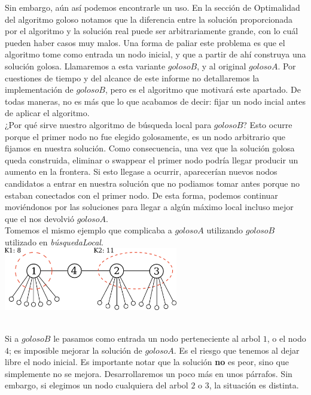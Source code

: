 Sin embargo, aún así podemos encontrarle un uso. En la sección de Optimalidad del algoritmo goloso notamos que la diferencia entre la solución proporcionada por el algoritmo y la solución real puede ser arbitrariamente grande, con lo cuál pueden haber casos muy malos. Una forma de paliar este problema es que el algoritmo tome como entrada un nodo inicial, y que a partir de ahí construya una solución golosa. Llamaremos a esta variante $golosoB$, y al original $golosoA$. Por cuestiones de tiempo y del alcance de este informe no detallaremos la implementación de $golosoB$, pero es el algoritmo que motivará este apartado. De todas maneras, no es más que lo que acabamos de decir: fijar un nodo incial antes de aplicar el algoritmo. \\

¿Por qué sirve nuestro algoritmo de búsqueda local para $golosoB$? Esto ocurre porque el primer nodo no fue elegido golosamente, es un nodo arbitrario que fijamos en nuestra solución. Como consecuencia, una vez que la solución golosa queda construida, eliminar o swappear el primer nodo podría llegar producir un aumento en la frontera. Si esto llegase a ocurrir, aparecerían nuevos nodos candidatos a entrar en nuestra solución que no podiamos tomar antes porque no estaban conectados con el primer nodo. De esta forma, podemos continuar moviéndonos por las soluciones para llegar a algún máximo local incluso mejor que el nos devolvió $golosoA$. \\

Tomemos el mismo ejemplo que complicaba a $golosoA$ utilizando $golosoB$ utilizado en \textit{búsquedaLocal}. \\

{\centering
    \includegraphics[width=0.57\textwidth]{informe/imgs/greedy_base_nodes_v2.png} \\
}
$ $\newline

Si a $golosoB$ le pasamos como entrada un nodo perteneciente al arbol $1$, o el nodo $4$; es imposible mejorar la solución de $golosoA$. Es el riesgo que tenemos al dejar libre el nodo inicial. Es importante notar que la solución \textbf{no} es peor, sino que simplemente no se mejora. Desarrollaremos un poco más en unos párrafos. Sin embargo, si elegimos un nodo cualquiera del arbol $2$ o $3$, la situación es distinta. \\

